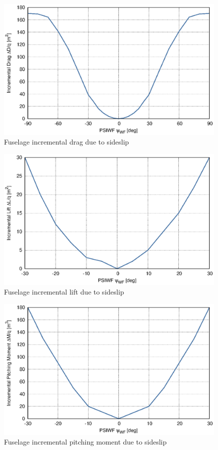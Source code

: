 \begin{figure}
  \centering
  \includegraphics[width=140mm]{eps/uh60_fuselage_psiwf_ddqfmp.eps}
  \caption{Fuselage incremental drag due to sideslip \cite{NASA-CR-166309}}
\end{figure}

\begin{figure}
  \centering
  \includegraphics[width=140mm]{eps/uh60_fuselage_psiwf_dlqfmp.eps}
  \caption{Fuselage incremental lift due to sideslip \cite{NASA-CR-166309}}
\end{figure}

\begin{figure}
  \centering
  \includegraphics[width=140mm]{eps/uh60_fuselage_psiwf_dmqfmp.eps}
  \caption{Fuselage incremental pitching moment due to sideslip \cite{NASA-CR-166309}}
\end{figure}
